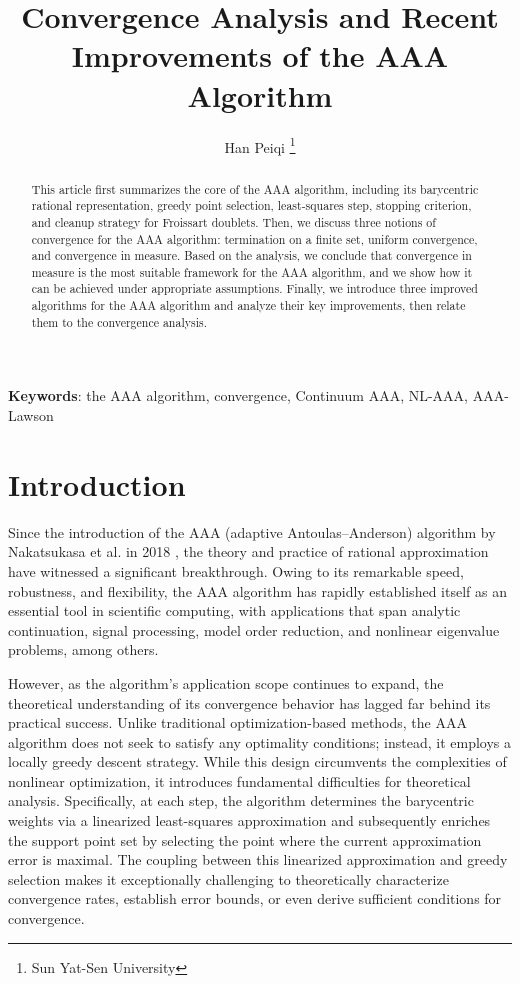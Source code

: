 \documentclass[12pt,a4paper]{article}  %
\title{Convergence Analysis and Recent Improvements of the AAA Algorithm}
\date{\DTMnow}
\author{Han Peiqi
    \thanks{Sun Yat-Sen University}
}
\newcounter{cite}
\theoremstyle{definition}
\numberwithin{equation}{section}
\begin{document}
\maketitle

\begin{abstract}
This article first summarizes the core of the AAA algorithm, including its barycentric rational representation, greedy point selection, least-squares step, stopping criterion, and cleanup strategy for Froissart doublets. Then, we discuss three notions of convergence for the AAA algorithm: termination on a finite set, uniform convergence, and convergence in measure. Based on the analysis, we conclude that convergence in measure is the most suitable framework for the AAA algorithm, and we show how it can be achieved under appropriate assumptions. Finally, we introduce three improved algorithms for the AAA algorithm and analyze their key improvements, then relate them to the convergence analysis.
\end{abstract}

\textbf{Keywords}: the AAA algorithm, convergence, Continuum AAA, NL-AAA, AAA-Lawson

\newpage
\tableofcontents
\newpage


\section{Introduction}

Since the introduction of the AAA (adaptive Antoulas–Anderson) algorithm by Nakatsukasa et al. in 2018 \cite{Nakatsukasa_2018}, the theory and practice of rational approximation have witnessed a significant breakthrough. Owing to its remarkable speed, robustness, and flexibility, the AAA algorithm has rapidly established itself as an essential tool in scientific computing, with applications that span analytic continuation, signal processing, model order reduction, and nonlinear eigenvalue problems, among others.

However, as the algorithm's application scope continues to expand, the theoretical understanding of its convergence behavior has lagged far behind its practical success. Unlike traditional optimization-based methods, the AAA algorithm does not seek to satisfy any optimality conditions; instead, it employs a locally greedy descent strategy. While this design circumvents the complexities of nonlinear optimization, it introduces fundamental difficulties for theoretical analysis. Specifically, at each step, the algorithm determines the barycentric weights via a linearized least-squares approximation and subsequently enriches the support point set by selecting the point where the current approximation error is maximal. The coupling between this linearized approximation and greedy selection makes it exceptionally challenging to theoretically characterize convergence rates, establish error bounds, or even derive sufficient conditions for convergence.
\end{document}
